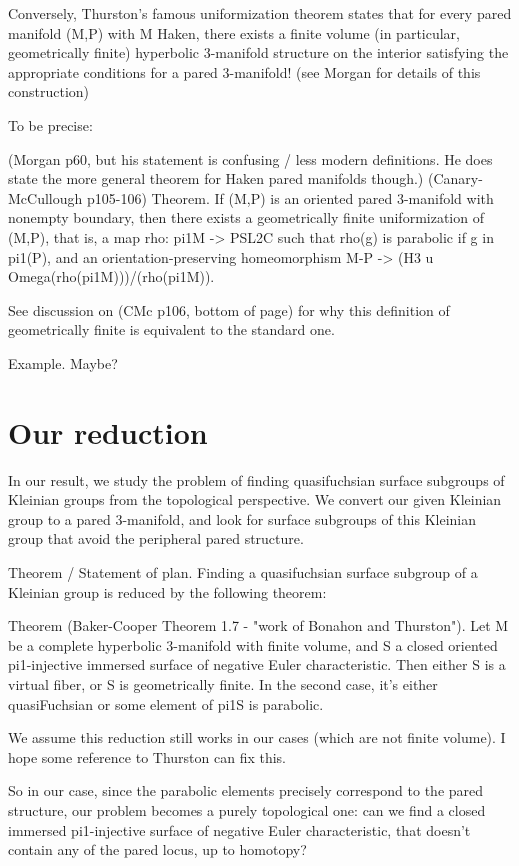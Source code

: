 \documentclass[12pt]{amsart}
\theoremstyle{definition}
\begin{document}
Conversely, Thurston's famous uniformization theorem states that for every
pared manifold (M,P) with M Haken, there exists a finite volume (in particular,
geometrically finite) hyperbolic 3-manifold structure on the interior
satisfying the appropriate conditions for a pared 3-manifold! (see Morgan for
details of this construction)

To be precise:

(Morgan p60, but his statement is confusing / less modern definitions. He does
state the more general theorem for Haken pared manifolds though.)
(Canary-McCullough p105-106)
Theorem. If (M,P) is an oriented pared 3-manifold with nonempty boundary, then
there exists a geometrically finite uniformization of (M,P), that is, a map
rho: pi1M -> PSL2C such that rho(g) is parabolic if g in pi1(P), and an
orientation-preserving homeomorphism M-P -> (H3
u Omega(rho(pi1M)))/(rho(pi1M)).

See discussion on (CMc p106, bottom of page) for why this definition of
geometrically finite is equivalent to the standard one.

Example. Maybe?

\section{Our reduction}

In our result, we study the problem of finding quasifuchsian surface subgroups
of Kleinian groups from the topological perspective. We convert our given
Kleinian group to a pared 3-manifold, and look for surface subgroups of this
Kleinian group that avoid the peripheral pared structure.

Theorem / Statement of plan. Finding a quasifuchsian surface subgroup of
a Kleinian group is reduced by the following theorem:

Theorem (Baker-Cooper Theorem 1.7 - "work of Bonahon and Thurston"). Let M be
a complete hyperbolic 3-manifold with finite volume, and S a closed oriented
pi1-injective immersed surface of negative Euler characteristic. Then either
S is a virtual fiber, or S is geometrically finite. In the second case, it's
either quasiFuchsian or some element of pi1S is parabolic.

We assume this reduction still works in our cases (which are not finite
volume). I hope some reference to Thurston can fix this.

So in our case, since the parabolic elements precisely correspond to the pared
structure, our problem becomes a purely topological one: can we find a
closed immersed pi1-injective surface of negative Euler characteristic, that
doesn't contain any of the pared locus, up to homotopy?
\end{document}
